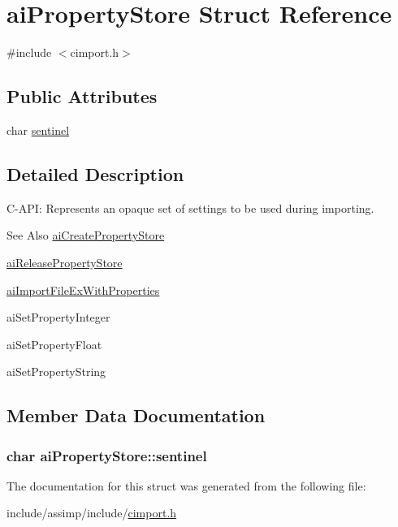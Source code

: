 \hypertarget{structai_property_store}{\section{ai\-Property\-Store Struct Reference}
\label{structai_property_store}
}


{\ttfamily \#include $<$cimport.\-h$>$}

\subsection*{Public Attributes}
\begin{DoxyCompactItemize}
\item 
char \hyperlink{structai_property_store_a53e97983bdbe38c596c7879555dc42a3}{sentinel}
\end{DoxyCompactItemize}


\subsection{Detailed Description}
C-\/\-A\-P\-I\-: Represents an opaque set of settings to be used during importing. \begin{DoxySeeAlso}{See Also}
\hyperlink{cimport_8h_a523d3d8b510203fb1a80d8702283f8c9}{ai\-Create\-Property\-Store} 

\hyperlink{cimport_8h_a579dddd75dbba5621c235df780ffc3e6}{ai\-Release\-Property\-Store} 

\hyperlink{cimport_8h_a9ec6845e46be4043cedb579bb85fcc0c}{ai\-Import\-File\-Ex\-With\-Properties} 

ai\-Set\-Property\-Integer 

ai\-Set\-Property\-Float 

ai\-Set\-Property\-String 
\end{DoxySeeAlso}


\subsection{Member Data Documentation}
\hypertarget{structai_property_store_a53e97983bdbe38c596c7879555dc42a3}{
\subsubsection[{sentinel}]{\setlength{\rightskip}{0pt plus 5cm}char ai\-Property\-Store\-::sentinel}}\label{structai_property_store_a53e97983bdbe38c596c7879555dc42a3}


The documentation for this struct was generated from the following file\-:\begin{DoxyCompactItemize}
\item 
include/assimp/include/\hyperlink{cimport_8h}{cimport.\-h}\end{DoxyCompactItemize}
